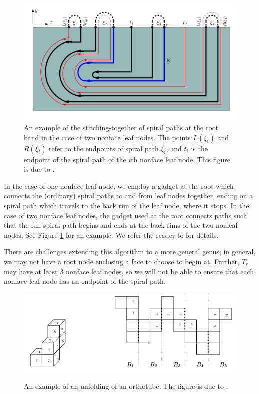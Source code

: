 \documentclass{article}
\begin{document}
\begin{figure}
  \begin{center}
    \includegraphics[width=.6\textwidth]{./figs/Nonface_leaf.png}
  \end{center}
  \caption{
    An example of the stitching-together of spiral paths at the root band in the case of two nonface leaf nodes.
    The points $L(\xi_i)$ and $R(\xi_i)$ refer to the endpoints of spiral path $\xi_i$, and $t_i$ is the endpoint of the spiral path of the $i$th nonface leaf node.
    This figure is due to \cite[Fig. 11.]{Damian_Demaine}.}\label{Nonface leaf figure}
\end{figure}

In the case of one nonface leaf node, we employ a gadget at the root which connects the (ordinary) spiral paths to and from leaf nodes together, ending on a spiral path which travels to the back rim of the leaf node, where it stops.
In the case of two nonface leaf nodes, the gadget used at the root connects paths such that the full spiral path begins and ends at the back rims of the two nonleaf nodes.
See Figure \ref{Nonface leaf figure} for an example.
We refer the reader to \cite{Damian_Demaine} for details.

There are challenges extending this algorithm to a more general genus;
in general, we may not have a root node enclosing a face to choose to begin at.
Further, $T_r$ may have at least 3 nonface leaf nodes, so we will not be able to ensure that each nonface leaf node has an endpoint of the spiral path.

\begin{figure}
  \begin{center}
    \includegraphics[width=.8\textwidth]{./figs/Orthotube_unfolding.png}\\
  \end{center}
  \caption{
    An example of an unfolding of an orthotube.
    The figure is due to \cite[Fig. 10]{Biedl_Demaine}.
  }\label{Orthotube figure}
\end{figure}
\end{document}

